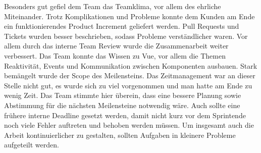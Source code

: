 \documentclass[10pt, a4paper]{article}
\begin{document}
Besonders gut gefiel dem Team das Teamklima, vor allem des ehrliche Miteinander.
Trotz Komplikationen und Probleme konnte dem Kunden am Ende ein funktionierendes Product Increment geliefert werden.
Pull Requests und Tickets wurden besser beschrieben, sodass Probleme verständlicher waren.
Vor allem durch das interne Team Review wurde die Zusammenarbeit weiter verbessert.
Das Team konnte das Wissen zu Vue, vor allem die Themen Reaktivität, Events und Kommunikation zwischen Komponenten ausbauen.
Stark bemängelt wurde der Scope des Meilensteins.
Das Zeitmanagement war an dieser Stelle nicht gut, es wurde sich zu viel vorgenommen und man hatte am Ende zu wenig Zeit.
Das Team stimmte hier überein, dass eine bessere Planung sowie Abstimmung für die nächsten Meilensteine notwendig wäre.
Auch sollte eine frühere interne Deadline gesetzt werden, damit nicht kurz vor dem Sprintende noch viele Fehler auftreten und behoben werden müssen.
Um insgesamt auch die Arbeit kontinuierlicher zu gestalten, sollten Aufgaben in kleinere Probleme aufgeteilt werden.
\end{document}
